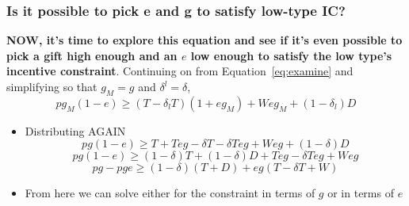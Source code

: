 \documentclass[12pt]{article}
\newcommand{\de}{\delta}
\begin{document}
\subsubsection{Is it possible to pick e and g to satisfy low-type IC?}

\textbf{NOW, it's time to explore this equation and see if it's even possible to pick a gift high enough and an $e$ low enough to satisfy the low type's incentive constraint}. Continuing on from Equation~\ref{eq:examine} and simplifying so that $g_M = g$ and $\de^l = \de$,
\[
	pg_M\left(1 - e\right) \geq \left(T - \de_l T \right) \left(1 + eg_M\right) + Weg_M + \left(1 - \de_l \right) D
\]
	\begin{itemize}
		\item Distributing AGAIN
			\[
				pg	\left(1 - e\right) \geq T + Teg - \de T - \de T eg + Weg + \left(1 - \de \right) D
			\]
			\[
				pg	\left(1 - e\right) \geq \left(1 - \de \right) T + \left(1 - \de \right) D + Teg - \de T eg + Weg
			\]
			\begin{equation}
				pg - pge \geq \left(1 - \de \right) \left( T + D \right) + eg \left( T - \de T + W \right)
				\label{eq:split}
			\end{equation}
		\item From here we can solve either for the constraint in terms of $g$ or in terms of $e$
	\end{itemize}		
			
\end{document}
